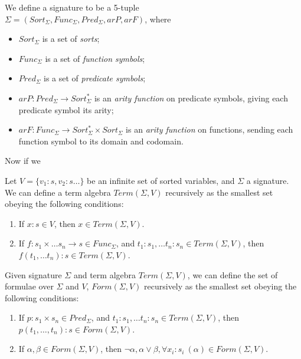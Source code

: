 \documentclass[12pt,a4paper]{article}
\begin{document}
\begin{definition}[Signature]
    We define a signature to be a 5-tuple \\$\Sigma = (Sort_\Sigma, Func_\Sigma, Pred_\Sigma, arP, arF)$, where 
    \begin{itemize}
        \item $Sort_\Sigma$ is a set of \textit{sorts};
        \item $Func_\Sigma$ is a set of \textit{function symbols};
        \item $Pred_\Sigma$ is a set of \textit{predicate symbols};
        \item $arP: Pred_\Sigma \to Sort_\Sigma^*$ is an \textit{arity function} on predicate symbols, giving each predicate symbol its arity; 
        \item $arF: Func_\Sigma \to Sort_\Sigma^* \times Sort_\Sigma$ is an \textit{arity function} on functions, sending each function symbol to its domain and codomain.
    \end{itemize} 
\end{definition}


Now if we 
\begin{definition}[Terms]
    Let $V = \{v_1 : s, v_2 : s \dots \}$ be an infinite set of sorted variables, and $\Sigma$ a signature. We can define a term algebra $Term(\Sigma, V)$ recursively as the smallest set obeying the following conditions:
    \begin{enumerate}[label=(\arabic*)]
        \item If $x :s \in V$, then $x \in Term(\Sigma, V)$.
        \item If $f : s_1 \times \dots s_n \to s \in Func_\Sigma$, and $t_1 : s_1, \dots t_n :s_n \in Term(\Sigma, V)$, then \\$f(t_1, \dots t_n) : s \in Term(\Sigma, V)$.
    \end{enumerate}
\end{definition}

\begin{definition}[Formula]
    Given signature $\Sigma$ and term algebra $Term(\Sigma, V)$, we can define the set of formulae over $\Sigma$ and $V$, $Form(\Sigma, V)$ recursively as the smallest set obeying the following conditions:
    \begin{enumerate}
        \item If $p : s_1 \times s_n \in Pred_\Sigma$, and $t_1 : s_1, \dots t_n :s_n \in Term(\Sigma, V)$, then $p(t_1, \dots, t_n) : s \in Form(\Sigma, V)$.
        \item If $\alpha, \beta \in Form(\Sigma, V)$, then $\neg \alpha, \alpha \lor \beta, \forall x_i : s_i\  (\alpha) \in Form(\Sigma, V)$.
    \end{enumerate}
\end{definition}
\end{document}

